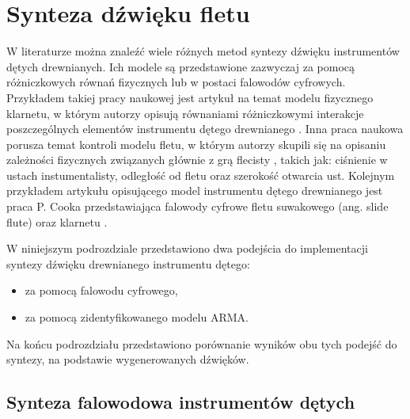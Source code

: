 \section{Synteza dźwięku fletu}

W literaturze można znaleźć wiele różnych metod syntezy dźwięku instrumentów dętych drewnianych. Ich modele są przedstawione zazwyczaj za pomocą różniczkowych równań fizycznych lub w postaci falowodów cyfrowych. 
Przykładem takiej pracy naukowej jest artykuł na temat modelu fizycznego klarnetu, w którym autorzy opisują równaniami różniczkowymi interakcje poszczególnych elementów instrumentu dętego drewnianego \cite{flute_klarnet}. Inna praca naukowa porusza temat kontroli modelu fletu, w którym autorzy skupili się na opisaniu zależności fizycznych związanych głównie z grą flecisty \cite{flute_flecista}, takich jak: ciśnienie w ustach instumentalisty, odległość od fletu oraz szerokość otwarcia ust. Kolejnym przykładem artykułu opisującego model instrumentu dętego drewnianego jest praca P. Cooka przedstawiająca falowody cyfrowe fletu suwakowego (ang. slide flute) oraz klarnetu \cite{flute_cook}.



W niniejszym podrozdziale przedstawiono dwa podejścia do implementacji syntezy dźwięku drewnianego instrumentu dętego:
\begin{itemize}
	\setlength\itemsep{-3pt}
	\item za pomocą falowodu cyfrowego,
	\item za pomocą zidentyfikowanego modelu ARMA.
\end{itemize}
Na końcu podrozdziału przedstawiono porównanie wyników obu tych podejść do syntezy, na podstawie wygenerowanych dźwięków.

\subsection{Synteza falowodowa instrumentów dętych}

